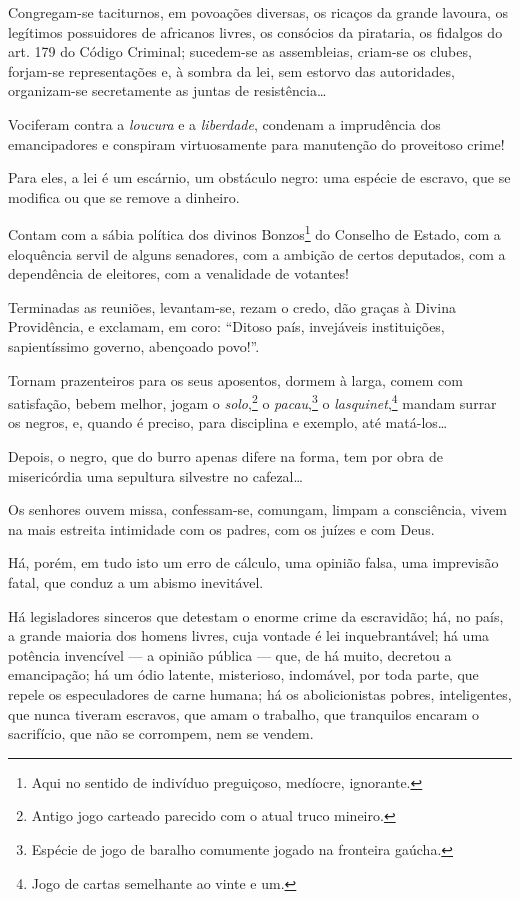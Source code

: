 {Congregam-se taciturnos, em povoações diversas, os ricaços da grande
lavoura, os legítimos possuidores de africanos livres, os consócios da
pirataria, os fidalgos do art. 179 do Código Criminal; sucedem-se as
assembleias, criam-se os clubes, forjam-se representações e, à sombra da
lei, sem estorvo das autoridades, organizam-se secretamente as juntas de
resistência\ldots{}

Vociferam contra a \emph{loucura} e a \emph{liberdade}, condenam a
imprudência dos emancipadores e conspiram virtuosamente para manutenção
do proveitoso crime!

Para eles, a lei é um escárnio, um obstáculo negro: uma espécie de
escravo, que se modifica ou que se remove a dinheiro.

Contam com a sábia política dos divinos Bonzos\footnote{Aqui no
  sentido de indivíduo preguiçoso, medíocre, ignorante.} do Conselho de
Estado, com a eloquência servil de alguns senadores, com a ambição de
certos deputados, com a dependência de eleitores, com a venalidade de
votantes!

Terminadas as reuniões, levantam-se, rezam o credo, dão graças à Divina
Providência, e exclamam, em coro: ``Ditoso país, invejáveis instituições,
sapientíssimo governo, abençoado povo!''.

Tornam prazenteiros para os seus aposentos, dormem à larga, comem com
satisfação, bebem melhor, jogam o \emph{solo},\footnote{Antigo jogo
  carteado parecido com o atual truco mineiro.} o
\emph{pacau},\footnote{Espécie de jogo de baralho comumente jogado na
  fronteira gaúcha.} o \emph{lasquinet},\footnote{Jogo de cartas
  semelhante ao vinte e um.} mandam surrar os negros, e,
quando é preciso, para disciplina e exemplo, até matá-los\ldots{}

Depois, o negro, que do burro apenas difere na forma, tem por obra de
misericórdia uma sepultura silvestre no cafezal\ldots{}

Os senhores ouvem missa, confessam-se, comungam, limpam a consciência,
vivem na mais estreita intimidade com os padres, com os juízes e com
Deus.

Há, porém, em tudo isto um erro de cálculo, uma opinião falsa, uma
imprevisão fatal, que conduz a um abismo inevitável.

Há legisladores sinceros que detestam o enorme crime da escravidão; há,
no país, a grande maioria dos homens livres, cuja vontade é lei
inquebrantável; há uma potência invencível --- a opinião pública ---
que, de há muito, decretou a emancipação; há um ódio latente,
misterioso, indomável, por toda parte, que repele os especuladores de
carne humana; há os abolicionistas pobres, inteligentes, que nunca
tiveram escravos, que amam o trabalho, que tranquilos encaram o
sacrifício, que não se corrompem, nem se vendem.

}

